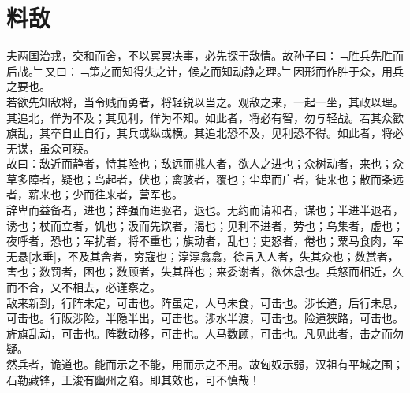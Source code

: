 \chapter{料敌}%
夫两国治戎，交和而舍，不以冥冥决事，必先探于敌情。故孙子曰：﹁胜兵先胜而后战。﹂又曰：﹁策之而知得失之计，候之而知动静之理。﹂因形而作胜于众，用兵之要也。\\
若欲先知敌将，当令贱而勇者，将轻锐以当之。观敌之来，一起一坐，其政以理。其追北，佯为不及；其见利，佯为不知。如此者，将必有智，勿与轻战。若其众歡旗乱，其卒自止自行，其兵或纵或横。其追北恐不及，见利恐不得。如此者，将必无谋，虽众可获。\\
故曰：敌近而静者，恃其险也；敌远而挑人者，欲人之进也；众树动者，来也；众草多障者，疑也；鸟起者，伏也；禽骇者，覆也；尘卑而广者，徒来也；散而条远者，薪来也；少而往来者，营军也。\\
辞卑而益备者，进也；辞强而进驱者，退也。无约而请和者，谋也；半进半退者，诱也；杖而立者，饥也；汲而先饮者，渴也；见利不进者，劳也；鸟集者，虚也；夜呼者，恐也；军扰者，将不重也；旗动者，乱也；吏怒者，倦也；粟马食肉，军无悬[水垂]，不及其舍者，穷寇也；淳淳翕翕，徐言入人者，失其众也；数赏者，害也；数罚者，困也；数顾者，失其群也；来委谢者，欲休息也。兵怒而相近，久而不合，又不相去，必谨察之。\\
敌来新到，行阵未定，可击也。阵虽定，人马未食，可击也。涉长道，后行未息，可击也。行阪涉险，半隐半出，可击也。涉水半渡，可击也。险道狭路，可击也。旌旗乱动，可击也。阵数动移，可击也。人马数顾，可击也。凡见此者，击之而勿疑。\\
然兵者，诡道也。能而示之不能，用而示之不用。故匈奴示弱，汉祖有平城之围；石勒藏锋，王浚有幽州之陷。即其效也，可不慎哉！
%
%
